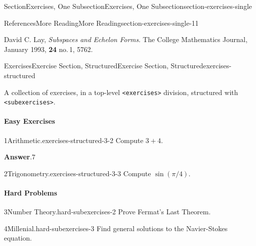 \documentclass[oneside,10pt,]{article}
\newcommand{\blocktitlefont}{\relax}
\newcommand{\ptxmono}[1]{\texttt{#1}}
\numberwithin{equation}{section}
\begin{document}
\begin{sectionptx}{Section}{Exercises, One Subsection}{}{Exercises, One Subsection}{}{}{section-exercises-single}
\begin{references-subsection-numberless}{References}{More Reading}{}{More Reading}{}{}{section-exercises-single-11}
\begin{referencelist}
\hypertarget{biblio-lay-article-repeat2}{}David C. Lay, \textit{Subspaces and Echelon Forms}. The College Mathematics Journal, January 1993, \textbf{24} no.\@\,1, 57\textendash{}62.
\end{referencelist}
\end{references-subsection-numberless}
\end{sectionptx}
%
%
\typeout{************************************************}
\typeout{************************************************}
%
\begin{exercises-section}{Exercises}{Exercise Section, Structured}{}{Exercise Section, Structured}{}{}{exercises-structured}
\begin{introduction}{}%
A collection of exercises, in a top-level \ptxmono{<exercises>} division, structured with \ptxmono{<subexercises>}.%
\end{introduction}%
\paragraph{Easy Exercises}\hypertarget{exercises-structured-3}{}
\begin{divisionexercise}{1}{Arithmetic.}{}{exercises-structured-3-2}%
Compute \(3+4\).%
\par\smallskip%
\noindent\textbf{\blocktitlefont Answer}.\hypertarget{exercises-structured-3-2-3}{}\quad{}\(7\)%
\end{divisionexercise}%
\begin{divisionexercise}{2}{Trigonometry.}{}{exercises-structured-3-3}%
Compute \(\sin(\pi/4)\).%
\end{divisionexercise}%
\paragraph{Hard Problems}\hypertarget{hard-subexercises}{}
\begin{divisionexercise}{3}{Number Theory.}{}{hard-subexercises-2}%
Prove Fermat's Last Theorem.%
\end{divisionexercise}%
\begin{divisionexercise}{4}{Millenial.}{}{hard-subexercises-3}%
Find general solutions to the Navier-Stokes equation.%
\end{divisionexercise}%

\end{exercises-section}
\end{document}

